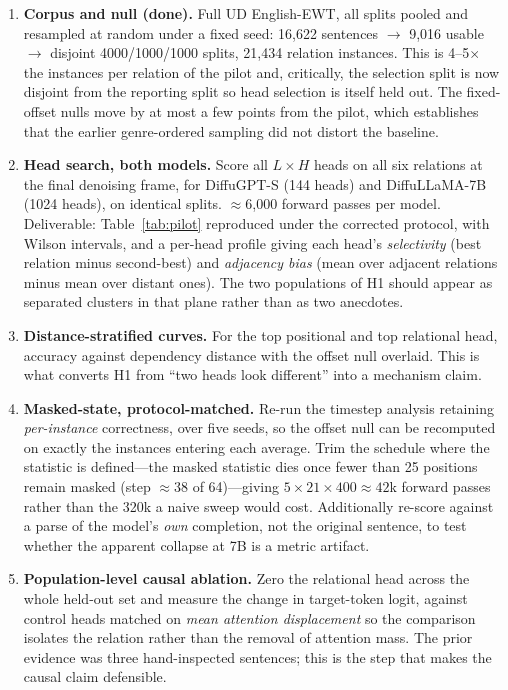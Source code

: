 \documentclass{article}
\begin{document}
\begin{enumerate}\itemsep2pt
\item \textbf{Corpus and null (done).} Full UD English-EWT, all splits pooled and
resampled at random under a fixed seed: 16{,}622 sentences $\to$ 9{,}016 usable
$\to$ disjoint 4000/1000/1000 splits, 21{,}434 relation instances. This is
4--5$\times$ the instances per relation of the pilot and, critically, the
selection split is now disjoint from the reporting split so head selection is
itself held out. The fixed-offset nulls move by at most a few points from the
pilot, which establishes that the earlier genre-ordered sampling did not distort
the baseline.

\item \textbf{Head search, both models.} Score all $L\times H$ heads on all six
relations at the final denoising frame, for DiffuGPT-S (144 heads) and
DiffuLLaMA-7B (1024 heads), on identical splits. $\approx$6{,}000 forward passes
per model. Deliverable: Table~\ref{tab:pilot} reproduced under the corrected
protocol, with Wilson intervals, and a per-head profile giving each head's
\emph{selectivity} (best relation minus second-best) and \emph{adjacency bias}
(mean over adjacent relations minus mean over distant ones). The two populations
of H1 should appear as separated clusters in that plane rather than as two
anecdotes.

\item \textbf{Distance-stratified curves.} For the top positional and top
relational head, accuracy against dependency distance with the offset null
overlaid. This is what converts H1 from ``two heads look different'' into a
mechanism claim.

\item \textbf{Masked-state, protocol-matched.} Re-run the timestep analysis
retaining \emph{per-instance} correctness, over five seeds, so the offset null
can be recomputed on exactly the instances entering each average. Trim the
schedule where the statistic is defined---the masked statistic dies once fewer
than 25 positions remain masked (step $\approx$38 of 64)---giving
$5 \times 21 \times 400 \approx 42$k forward passes rather than the 320k a naive
sweep would cost. Additionally re-score against a parse of the model's
\emph{own} completion, not the original sentence, to test whether the apparent
collapse at 7B is a metric artifact.

\item \textbf{Population-level causal ablation.} Zero the relational head across
the whole held-out set and measure the change in target-token logit, against
control heads matched on \emph{mean attention displacement} so the comparison
isolates the relation rather than the removal of attention mass. The prior
evidence was three hand-inspected sentences; this is the step that makes the
causal claim defensible.


\end{enumerate}
\end{document}
